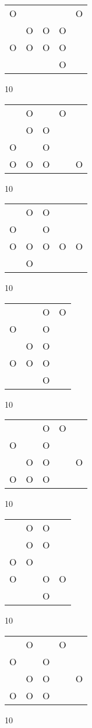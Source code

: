 \begin{tabular}{|m{0.2cm}m{0.2cm}m{0.2cm}m{0.2cm}m{0.2cm}|}\hline
O& & & &O\\
 &O&O&O& \\
O&O&O&O& \\
 & & &O& \\
\hline\end{tabular}10
\begin{tabular}{|m{0.2cm}m{0.2cm}m{0.2cm}m{0.2cm}m{0.2cm}|}\hline
 &O& &O& \\
 &O&O& & \\
O& &O& & \\
O&O&O& &O\\
\hline\end{tabular}10
\begin{tabular}{|m{0.2cm}m{0.2cm}m{0.2cm}m{0.2cm}m{0.2cm}|}\hline
 &O&O& & \\
O& &O& & \\
O&O&O&O&O\\
 &O& & & \\
\hline\end{tabular}10
\begin{tabular}{|m{0.2cm}m{0.2cm}m{0.2cm}m{0.2cm}|}\hline
 & &O&O\\
O& &O& \\
 &O&O& \\
O&O&O& \\
 & &O& \\
\hline\end{tabular}10
\begin{tabular}{|m{0.2cm}m{0.2cm}m{0.2cm}m{0.2cm}m{0.2cm}|}\hline
 & &O&O& \\
O& &O& & \\
 &O&O& &O\\
O&O&O& & \\
\hline\end{tabular}10
\begin{tabular}{|m{0.2cm}m{0.2cm}m{0.2cm}m{0.2cm}|}\hline
 &O&O& \\
 &O&O& \\
O&O& & \\
O& &O&O\\
 & &O& \\
\hline\end{tabular}10
\begin{tabular}{|m{0.2cm}m{0.2cm}m{0.2cm}m{0.2cm}m{0.2cm}|}\hline
 &O& &O& \\
O& &O& & \\
 &O&O& &O\\
O&O&O& & \\
\hline\end{tabular}10
